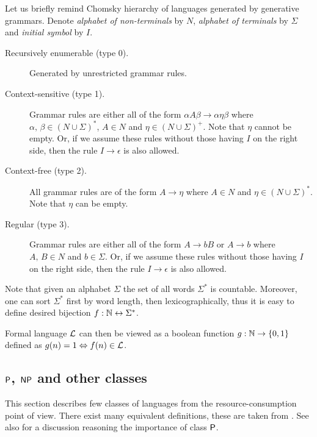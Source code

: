 		Let us briefly remind Chomsky hierarchy of languages generated by generative grammars. Denote {\em alphabet of non-terminals} by $N$, {\em alphabet of terminals} by $\Sigma$ and {\em initial symbol} by $I$.
		\begin{description}
			\item[Recursively enumerable (type 0).] Generated by unrestricted grammar rules.
			\item[Context-sensitive (type 1).] Grammar rules are either all of the form $\alpha A \beta \rightarrow \alpha \eta \beta$ where $\alpha,\,\beta\in (N\cup\Sigma)^*$, $A\in N$ and $\eta\in (N\cup\Sigma)^+$. Note that $\eta$ cannot be empty. Or, if we assume these rules without those having $I$ on the right side, then the rule $I\rightarrow \epsilon$ is also allowed.
			\item[Context-free (type 2).] All grammar rules are of the form $A\rightarrow\eta$ where $A\in N$ and $\eta\in (N\cup\Sigma)^*$. Note that $\eta$ can be empty.
			\item[Regular (type 3).] Grammar rules are either all of the form $A\rightarrow bB$ or $A\rightarrow b$ where $A,\,B\in N$ and $b\in\Sigma$. Or, if we assume these rules without those having $I$ on the right side, then the rule $I\rightarrow \epsilon$ is also allowed.
		\end{description}
		
		\begin{remark}
			Note that given an alphabet $\Sigma$ the set of all words $\Sigma^*$ is countable. Moreover, one can sort $\Sigma^*$ first by word length, then lexicographically, thus it is easy to define desired bijection $f: \N \leftrightarrow \Sigma^* $.
			
			Formal language ${\cal L}$ can then be viewed as a boolean function $g: \N \rightarrow \{0,1\}$ defined as
			$g(n) = 1 \iff f(n)\in {\cal L}$.
		\end{remark}
		
	
	\subsection{$\P$, $\NP$ and other classes}
	\label{sec:PNP}
		
		This section describes few classes of languages from the resource-consumption point of view. There exist many equivalent definitions, these are taken from \cite{book_comp}. See also \cite[Chapter 1.5.1]{book_comp} for a discussion reasoning the importance of class $\P$.
		
